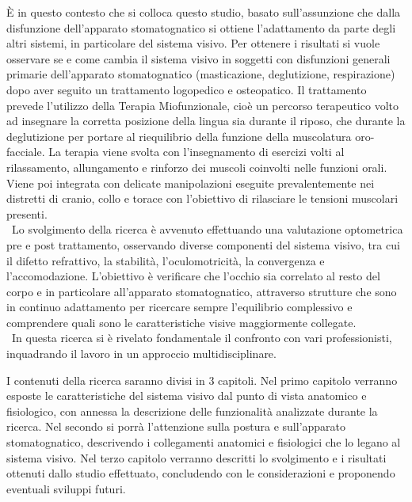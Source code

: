 È in questo contesto che si colloca questo studio, basato sull'assunzione che dalla disfunzione dell'apparato stomatognatico si ottiene l'adattamento da parte degli altri sistemi, in particolare del sistema visivo. Per ottenere i risultati si vuole osservare se e come cambia il sistema visivo in soggetti con disfunzioni generali primarie dell'apparato stomatognatico (masticazione, deglutizione, respirazione) dopo aver seguito un trattamento logopedico e osteopatico. Il trattamento prevede l'utilizzo della Terapia Miofunzionale, cioè un percorso terapeutico volto ad insegnare la corretta posizione della lingua sia durante il riposo, che durante la deglutizione per portare al riequilibrio della funzione della muscolatura oro-facciale. La terapia viene svolta con l'insegnamento di esercizi volti al rilassamento, allungamento e rinforzo dei muscoli coinvolti nelle funzioni orali.  Viene poi integrata con delicate manipolazioni eseguite prevalentemente nei distretti di cranio, collo e torace con l'obiettivo di rilasciare le tensioni muscolari presenti.
\\\
Lo svolgimento della ricerca è avvenuto effettuando una valutazione optometrica pre e post trattamento, osservando diverse componenti del sistema visivo, tra cui il difetto refrattivo, la stabilità, l'oculomotricità, la convergenza e l'accomodazione.
L'obiettivo è verificare che l'occhio sia correlato al resto del corpo e in particolare all'apparato stomatognatico, attraverso strutture che sono in continuo adattamento per ricercare sempre l'equilibrio complessivo e comprendere quali sono le caratteristiche visive maggiormente collegate. 
\\\
In questa ricerca si è rivelato fondamentale il confronto con vari professionisti, inquadrando il lavoro in un approccio multidisciplinare.


I contenuti della ricerca saranno divisi in 3 capitoli. Nel primo capitolo verranno esposte le caratteristiche del sistema visivo dal punto di vista anatomico e fisiologico, con annessa la descrizione delle funzionalità analizzate durante la ricerca. Nel secondo si porrà l'attenzione sulla postura e sull'apparato stomatognatico, descrivendo i collegamenti anatomici e fisiologici che lo legano al sistema visivo. Nel terzo capitolo verranno descritti lo svolgimento e i risultati ottenuti dallo studio effettuato, concludendo con le considerazioni e proponendo eventuali sviluppi futuri.

